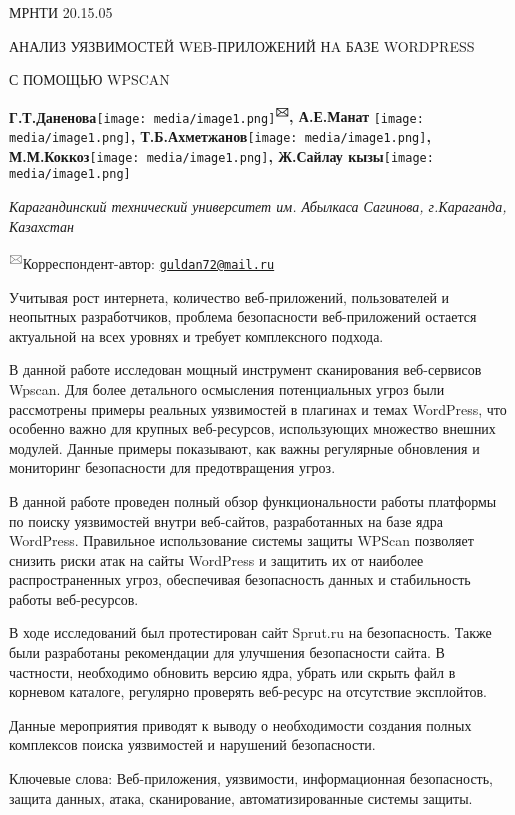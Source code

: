 \documentclass[
]{article}
\begin{document}
МРНТИ 20.15.05

АНАЛИЗ УЯЗВИМОСТЕЙ WEB-ПРИЛОЖЕНИЙ НA БАЗЕ WORDPRESS

С ПОМОЩЬЮ WPSCAN

\textbf{Г.Т.Даненова}\texttt{[image: media/image1.png]}\textbf{\textsuperscript{🖂},
А.Е.Манат}
\texttt{[image: media/image1.png]}\textbf{,
Т.Б.Ахметжанов}\texttt{[image: media/image1.png]}\textbf{,
М.М.Коккоз}\texttt{[image: media/image1.png]}\textbf{,
Ж.Сайлау
кызы}\texttt{[image: media/image1.png]}

\emph{Карагандинский технический университет им. Абылкаса Сагинова,
г.Караганда, Казахстан}

\textsuperscript{🖂}Корреспондент-автор:
\href{mailto:guldan72@mail.ru}{\nolinkurl{guldan72@mail.ru}}

Учитывая рост интернета, количество веб-приложений, пользователей и
неопытных разработчиков, проблема безопасности веб-приложений остается
актуальной на всех уровнях и требует комплексного подхода.

В данной работе исследован мощный инструмент сканирования веб-сервисов
Wpscan. Для более детального осмысления потенциальных угроз были
рассмотрены примеры реальных уязвимостей в плагинах и темах WordPress,
что особенно важно для крупных веб-ресурсов, использующих множество
внешних модулей. Данные примеры показывают, как важны регулярные
обновления и мониторинг безопасности для предотвращения угроз.

В данной работе проведен полный обзор функциональности работы платформы
по поиску уязвимостей внутри веб-сайтов, разработанных на базе ядра
WordPress. Правильное использование системы защиты WPScan позволяет
снизить риски атак на сайты WordPress и защитить их от наиболее
распространенных угроз, обеспечивая безопасность данных и стабильность
работы веб-ресурсов.

В ходе исследований был протестирован сайт Sprut.ru на безопасность.
Также были разработаны рекомендации для улучшения безопасности сайта. В
частности, необходимо обновить версию ядра, убрать или скрыть файл в
корневом каталоге, регулярно проверять веб-ресурс на отсутствие
эксплойтов.

Данные мероприятия приводят к выводу о необходимости создания полных
комплексов поиска уязвимостей и нарушений безопасности.

Ключевые слова: Веб-приложения, уязвимости, информационная безопасность,
защита данных, атака, сканирование, автоматизированные системы защиты.
\end{document}
